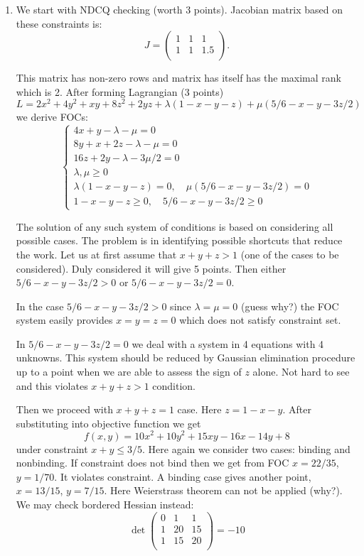 \documentclass[12pt]{article} %
\theoremstyle{definition} %
\begin{document}
\begin{enumerate}[resume]

\item We start with NDCQ checking (worth 3 points). 
Jacobian matrix based on these constraints is:
\[
J = \begin{pmatrix}
    1 & 1 & 1 \\
    1 & 1 & 1.5 \\
\end{pmatrix}.
\]

This matrix has non-zero rows and matrix has itself has the maximal rank which is 2. 
After forming Lagrangian (3 points) 
\[
L = 2x^2 + 4y^2 +xy + 8z^2 + 2yz + \lambda (1 - x - y - z) + \mu (5/6 - x - y - 3z/2)  
\]
we derive FOCs:   
\[
\begin{cases}
4x + y - \lambda - \mu = 0 \\
8y + x + 2z -\lambda - \mu = 0 \\
16z + 2y - \lambda - 3\mu/2 = 0 \\
\lambda, \mu \geq 0 \\
\lambda (1 - x - y - z) =0, \quad \mu (5/6 - x - y - 3z/2) = 0 \\
1 - x - y - z \geq 0, \quad 5/6 - x - y - 3z/2 \geq 0
\end{cases}
\]

The solution of any such system of conditions is based on considering all possible cases. 
The problem is in identifying possible shortcuts that reduce the work. 
Let us at first assume that $x+y+z >1$ (one of the cases to be considered). 
Duly considered it will give 5 points. 
Then either $5/6 - x - y - 3z/2 >0$  or $5/6 - x - y - 3z/2 =0$. 


In the case $5/6 - x - y - 3z/2 >0$ since $\lambda = \mu =0$ (guess why?) 
the FOC system easily provides $x=y=z=0$ which does not satisfy constraint set. 


In $5/6 - x - y - 3z/2 =0$ we deal with a system in 4 equations with 4 unknowns. 
This system should be reduced by Gaussian elimination procedure up to a point when we are able to assess the sign of $z$ alone. 
Not hard to see  and this violates $x+y+z>1$ condition. 


Then we proceed with $x+y+z =1$ case.
Here $z = 1 - x- y$. 
After substituting into objective function we get
\[
f(x, y) = 10x^2  + 10y^2 + 15xy -16x -14y + 8
\]
under constraint $x+y \leq 3/5$. 
Here again we consider two cases: binding and nonbinding. 
If constraint does not bind then we get from FOC $x=22/35$, $y=1/70$. 
It violates constraint. 
A binding case gives another point, $x=13/15$, $y=7/15$. 
Here Weierstrass theorem can not be applied (why?). 
We may 
check bordered Hessian instead:
\[
\det
\begin{pmatrix}
    0 & 1 & 1\\
    1 & 20 & 15 \\
    1 & 15 & 20 \\
\end{pmatrix} = -10
\] 


\end{enumerate}
\end{document}
